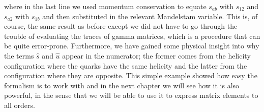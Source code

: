 where in the last line we used momentum conservation to equate $s_{ab}$ with $s_{12}$ and $s_{a2}$ with $s_{1b}$ and then substituted in the relevant Mandelstam variable. This is, of course, the same result as before except we did not have to go through the trouble of evaluating the traces of gamma matrices, which is a procedure that can be quite error-prone. Furthermore, we have gained some physical insight into why the terms $\hat{s}$ and $\hat{u}$ appear in the numerator; the former comes from the helicity configuration where the quarks have the same helicity and the latter from the configuration where they are opposite. This simple example showed how easy the formalism is to work with and in the next chapter we will see how it is also powerful, in the sense that we will be able to use it to express matrix elements to all orders. 